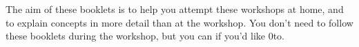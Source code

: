 The aim of these booklets is to help you attempt these workshops at home, and to explain concepts in more detail than at the workshop. You don't need to follow these booklets during the workshop, but you can if you'd like 0to.